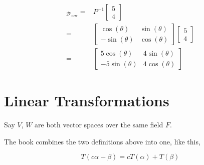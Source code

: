 \documentclass[12pt]{article}
\def\B{\mathcal B}
\begin{document}
{\begin{enumerate}
        \begin{align*}
          [(5, 4)]_{\B'_\text{new}} =&P^{-1}
          \begin{bmatrix} 5 \\ 4 \end{bmatrix} \\
          =&\begin{bmatrix}
            \cos(\theta) & \sin(\theta) \\
            -\sin(\theta) & \cos(\theta)
          \end{bmatrix}
          \begin{bmatrix} 5 \\ 4 \end{bmatrix} \\
          =&\begin{bmatrix}
            5\cos(\theta) & 4\sin(\theta) \\
            -5\sin(\theta) & 4\cos(\theta)
          \end{bmatrix}
        \end{align*}
    \end{enumerate}
  }

  \section{Linear Transformations}

  Say $V$, $W$ are both vector spaces over the same field $F$.
  

  The book combines the two definitions above into one, like this,

  \[
    T(c\alpha + \beta) = cT(\alpha) + T(\beta)
  \]
\end{document}
